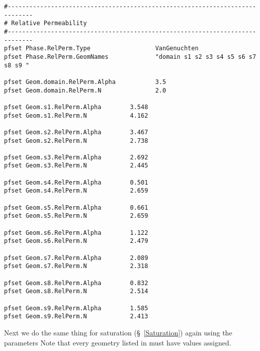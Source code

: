 \begin{verbatim}
#-----------------------------------------------------------------------------
# Relative Permeability
#-----------------------------------------------------------------------------
pfset Phase.RelPerm.Type                  VanGenuchten
pfset Phase.RelPerm.GeomNames             "domain s1 s2 s3 s4 s5 s6 s7 s8 s9 "

pfset Geom.domain.RelPerm.Alpha           3.5
pfset Geom.domain.RelPerm.N               2.0

pfset Geom.s1.RelPerm.Alpha        3.548
pfset Geom.s1.RelPerm.N            4.162

pfset Geom.s2.RelPerm.Alpha        3.467
pfset Geom.s2.RelPerm.N            2.738

pfset Geom.s3.RelPerm.Alpha        2.692
pfset Geom.s3.RelPerm.N            2.445

pfset Geom.s4.RelPerm.Alpha        0.501
pfset Geom.s4.RelPerm.N            2.659

pfset Geom.s5.RelPerm.Alpha        0.661
pfset Geom.s5.RelPerm.N            2.659

pfset Geom.s6.RelPerm.Alpha        1.122
pfset Geom.s6.RelPerm.N            2.479

pfset Geom.s7.RelPerm.Alpha        2.089
pfset Geom.s7.RelPerm.N            2.318

pfset Geom.s8.RelPerm.Alpha        0.832
pfset Geom.s8.RelPerm.N            2.514

pfset Geom.s9.RelPerm.Alpha        1.585
pfset Geom.s9.RelPerm.N            2.413
\end{verbatim}

Next we do the same thing for saturation (\S~\ref{Saturation}) again using the  parameters
Note that every geometry listed in  must have 
values assigned. 


